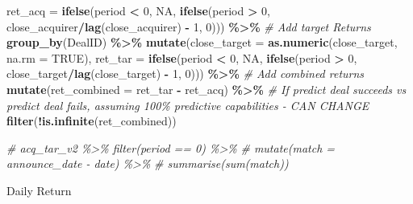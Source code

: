 \documentclass[
]{article}
\newenvironment{Shaded}{\begin{snugshade}}{\end{snugshade}}
\newcommand{\CommentTok}[1]{\textcolor[rgb]{0.56,0.35,0.01}{\textit{#1}}}
\newcommand{\DataTypeTok}[1]{\textcolor[rgb]{0.13,0.29,0.53}{#1}}
\newcommand{\DecValTok}[1]{\textcolor[rgb]{0.00,0.00,0.81}{#1}}
\newcommand{\KeywordTok}[1]{\textcolor[rgb]{0.13,0.29,0.53}{\textbf{#1}}}
\newcommand{\NormalTok}[1]{#1}
\newcommand{\OperatorTok}[1]{\textcolor[rgb]{0.81,0.36,0.00}{\textbf{#1}}}
\newcommand{\OtherTok}[1]{\textcolor[rgb]{0.56,0.35,0.01}{#1}}
\newcommand{\StringTok}[1]{\textcolor[rgb]{0.31,0.60,0.02}{#1}}
\begin{document}
\begin{Shaded}
\begin{Highlighting}[]
    \DataTypeTok{ret\_acq =} \KeywordTok{ifelse}\NormalTok{(period }\OperatorTok{\textless{}}\StringTok{ }\DecValTok{0}\NormalTok{, }\OtherTok{NA}\NormalTok{, }\KeywordTok{ifelse}\NormalTok{(period }\OperatorTok{\textgreater{}}\StringTok{ }\DecValTok{0}\NormalTok{, close\_acquirer}\OperatorTok{/}\KeywordTok{lag}\NormalTok{(close\_acquirer) }\OperatorTok{{-}}\StringTok{ }\DecValTok{1}\NormalTok{, }\DecValTok{0}\NormalTok{))) }\OperatorTok{\%\textgreater{}\%}
\StringTok{  }
\StringTok{  }\CommentTok{\# Add target Returns}
\StringTok{  }\KeywordTok{group\_by}\NormalTok{(DealID) }\OperatorTok{\%\textgreater{}\%}
\StringTok{  }\KeywordTok{mutate}\NormalTok{(}\DataTypeTok{close\_target =} \KeywordTok{as.numeric}\NormalTok{(close\_target, }\DataTypeTok{na.rm =} \OtherTok{TRUE}\NormalTok{),}
    \DataTypeTok{ret\_tar =} \KeywordTok{ifelse}\NormalTok{(period }\OperatorTok{\textless{}}\StringTok{ }\DecValTok{0}\NormalTok{, }\OtherTok{NA}\NormalTok{, }\KeywordTok{ifelse}\NormalTok{(period }\OperatorTok{\textgreater{}}\StringTok{ }\DecValTok{0}\NormalTok{, close\_target}\OperatorTok{/}\KeywordTok{lag}\NormalTok{(close\_target) }\OperatorTok{{-}}\StringTok{ }\DecValTok{1}\NormalTok{, }\DecValTok{0}\NormalTok{))) }\OperatorTok{\%\textgreater{}\%}
\StringTok{  }
\StringTok{  }\CommentTok{\# Add combined returns}
\StringTok{  }\KeywordTok{mutate}\NormalTok{(}\DataTypeTok{ret\_combined =}\NormalTok{  ret\_tar }\OperatorTok{{-}}\StringTok{ }\NormalTok{ret\_acq) }\OperatorTok{\%\textgreater{}\%}\StringTok{ }\CommentTok{\# If predict deal succeeds vs predict deal fails, assuming 100\% predictive capabilities {-} CAN CHANGE}
\StringTok{  }
\StringTok{  }\KeywordTok{filter}\NormalTok{(}\OperatorTok{!}\KeywordTok{is.infinite}\NormalTok{(ret\_combined))}

\CommentTok{\# acq\_tar\_v2 \%\textgreater{}\% filter(period == 0) \%\textgreater{}\% }
\CommentTok{\#   mutate(match = announce\_date {-} date) \%\textgreater{}\% }
\CommentTok{\#   summarise(sum(match))}
\end{Highlighting}
\end{Shaded}

Daily Return
\end{document}
